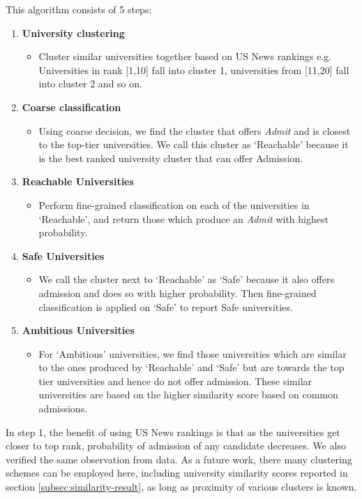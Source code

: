 \documentclass{sig-alternate-05-2015}
\begin{document}
This algorithm consists of 5 steps:
\begin {enumerate}
\item \textbf{University clustering}
    \begin {itemize}
    \item Cluster similar universities together based on US News rankings e.g. Universities in rank [1,10] fall into cluster 1, universities from [11,20] fall into cluster 2 and so on.
    \end {itemize}
\item \textbf {Coarse classification}
    \begin {itemize}
    \item Using coarse decision, we find the cluster that offers \textit{Admit} and is closest to the top-tier universities. We call this cluster as `Reachable' because it is the best ranked university cluster that can offer Admission.
    \end {itemize}
\item \textbf {Reachable Universities}
    \begin {itemize}
    \item Perform fine-grained classification on each of the universities in `Reachable', and return those which produce an \textit{Admit} with highest probability.
    \end {itemize}
\item \textbf {Safe Universities}
    \begin {itemize}
    \item We call the cluster next to `Reachable' as `Safe' because it also offers admission and does so with higher probability. Then fine-grained classification is applied on `Safe' to report Safe universities.
    \end {itemize}
\item \textbf {Ambitious Universities}
    \begin {itemize}
    \item For `Ambitious' universities, we find those universities which are similar to the ones produced by `Reachable' and `Safe' but are towards the top tier universities and hence do not offer admission. These similar universities are based on the higher similarity score based on common admissions.
    \end {itemize}
\end {enumerate}

In step 1, the benefit of using US News rankings is that as the universities get closer to top rank, probability of admission of any candidate decreases. We also verified the same observation from data. As a future work, there many clustering schemes can be employed here, including university similarity scores reported in section \ref{subsec:similarity-result}, as long as proximity of various clusters is known.
\end{document}
